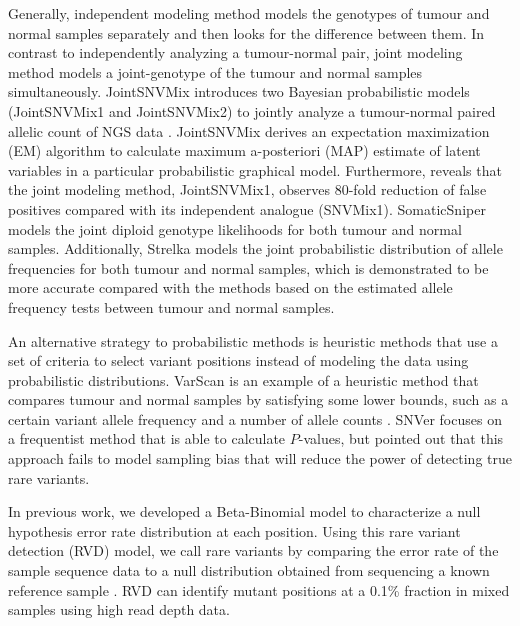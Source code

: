 \documentclass{bmcart}
\begin{document}
Generally, independent modeling method models the genotypes of tumour and normal samples separately and then looks for the difference between them.
In contrast to independently analyzing a tumour-normal pair, joint modeling method models a joint-genotype of the tumour and normal samples simultaneously.
JointSNVMix introduces two Bayesian probabilistic models (JointSNVMix1 and JointSNVMix2) to jointly analyze a tumour-normal paired allelic count of NGS data \cite{roth2012jointsnvmix}.
JointSNVMix derives an expectation maximization (EM) algorithm to calculate maximum a-posteriori (MAP) estimate of latent variables in a particular probabilistic graphical model.
Furthermore, \cite{roth2012jointsnvmix} reveals that the joint modeling method, JointSNVMix1, observes 80-fold reduction of false positives compared with its independent analogue (SNVMix1).
SomaticSniper \cite{larson2012somaticsniper} models the joint diploid genotype likelihoods for both tumour and normal samples.
Additionally, Strelka \cite{saunders2012strelka} models the joint probabilistic distribution of allele frequencies for both tumour and normal samples, which is demonstrated to be more accurate compared with the methods based on the estimated allele frequency tests between tumour and normal samples.

An alternative strategy to probabilistic methods is heuristic methods that use a set of criteria to select variant positions instead of modeling the data using probabilistic distributions.
VarScan is an example of a heuristic method that compares tumour and normal samples by satisfying some lower bounds, such as a certain variant allele frequency and a number of allele counts \cite{koboldt2012varscan}.
SNVer focuses on a frequentist method that is able to calculate $P$-values, but \cite{wei2011snver} pointed out that this approach fails to model sampling bias that will reduce the power of detecting true rare variants.

In previous work, we developed a Beta-Binomial model to characterize a null hypothesis error rate distribution at each position.
Using this rare variant detection (RVD) model, we call rare variants by comparing the error rate of the sample sequence data to a null distribution obtained from sequencing a known reference sample \cite{flaherty2011ultrasensitive}.
RVD can identify mutant positions at a 0.1\% fraction in mixed samples using high read depth data.
\end{document}
